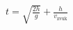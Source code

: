 \documentclass[preview]{standalone}
\begin{document}
\begin{align*}
t = \sqrt {\frac{2h}{g}} + \frac{h}{v_{\text{zvuk}}}
\end{align*}
\end{document}
